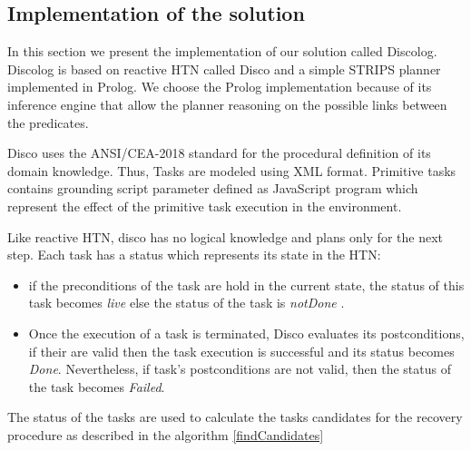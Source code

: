 \documentclass[conference]{IEEEtran}
\begin{document}
		
		\subsection{Implementation of the solution}
		
		\par In this section we present the implementation of our solution called Discolog. Discolog is based on reactive HTN called Disco \cite{rich2009building} and a simple STRIPS planner implemented in Prolog. We choose the Prolog implementation because of its inference engine that allow the planner reasoning on the possible links between the predicates.
		\par  Disco uses the ANSI/CEA-2018 standard for the procedural definition of its domain knowledge. Thus, Tasks are modeled using XML
		format. Primitive tasks contains grounding script parameter defined	as JavaScript program which represent the effect of the primitive task execution
		in the environment.
		\par  Like reactive HTN, disco has no logical knowledge and plans only for the next step. Each task has a status which represents its state in the HTN:
		\begin{itemize}
			\item  if the preconditions of the task are hold in the current state, the status of this task becomes \textit{live} else the status of the task is \textit{notDone} .
			\item  Once the execution of a task is terminated, Disco evaluates its postconditions, if their are valid then the task execution is successful and its status becomes \textit{Done}. Nevertheless, if task's postconditions  are not valid, then the status of the task becomes \textit{Failed}.
		\end{itemize}
		The status of the tasks are used to calculate the tasks candidates for the recovery procedure as described in the algorithm \ref{findCandidates} 		
		
\end{document}

